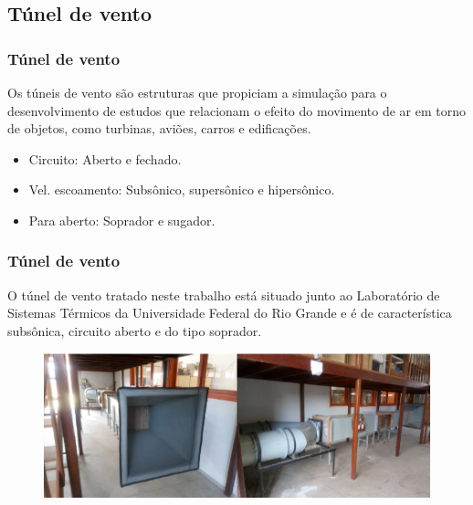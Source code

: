 \subsection{Túnel de vento}

\begin{frame}
\frametitle{Túnel de vento}

Os túneis de vento são estruturas que propiciam a simulação para o desenvolvimento de estudos que relacionam o efeito do movimento de ar em torno de objetos, como turbinas, aviões, carros e edificações. 

\begin{itemize}
    \item Circuito: Aberto e fechado.
    \item Vel. escoamento: Subsônico, supersônico e hipersônico.
    \item Para aberto: Soprador e sugador.
\end{itemize}

\end{frame}

\begin{frame}
\frametitle{Túnel de vento}

O túnel de vento tratado neste trabalho está situado junto ao Laboratório de Sistemas Térmicos da Universidade Federal do Rio Grande e é de característica subsônica, circuito aberto e do tipo soprador.

\begin{figure}
\centering
\includegraphics[scale = 0.4]{figuras/tunelfran}
\end{figure}

\end{frame}
